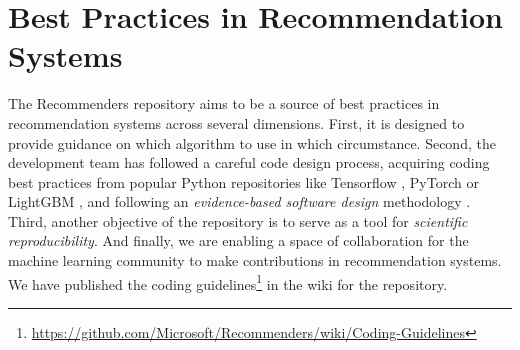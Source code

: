 \section{Best Practices in Recommendation Systems}

The Recommenders repository aims to be a source of best practices in recommendation systems
across several dimensions. First, it is designed to provide guidance on 
which algorithm to use in which circumstance. 
Second, the development team has followed a careful code design process, acquiring 
coding best practices from popular Python repositories like Tensorflow 
\cite{abadi2016tensorflow}, PyTorch \cite{paszke2017automatic} or LightGBM 
\cite{ke2017lightgbm}, and following an {\em evidence-based software design} methodology 
\cite{joeglekar2018evidence}. Third, another objective of the repository
is to serve as a tool for {\em scientific reproducibility}. And finally, we are enabling a 
space of collaboration for the machine learning community to make
contributions in recommendation systems.
We have published the coding 
guidelines\footnote{\url{https://github.com/Microsoft/Recommenders/wiki/Coding-Guidelines}\label{foot_code_guidelines}} 
in the wiki for the repository. 





